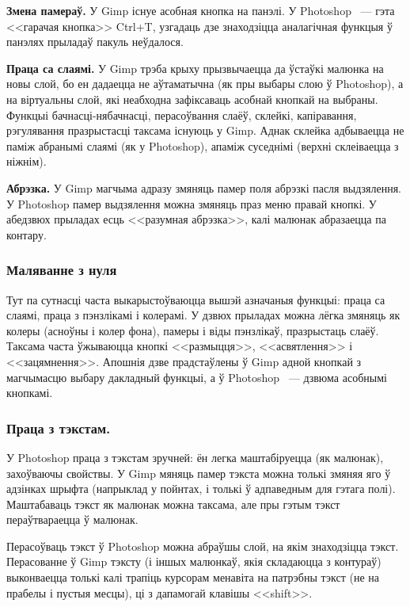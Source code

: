 \documentclass[10pt, a5paper]{article}
\begin{document}
\textbf{Змена памераў.} У Gimp існуе асобная кнопка на панэлі. У Photoshop ~--- гэта <<гарачая кнопка>> Ctrl+T, узгадаць дзе знаходзіцца аналагічная функцыя ў панэлях прыладаў пакуль неўдалося.

\textbf{Праца са слаямі.} У Gimp трэба крыху прызвычаецца да \linebreak ўстаўкі малюнка на новы слой, бо ен дадаецца не аўтаматычна (як пры выбары слою ў Photoshop), а на віртуальны слой, які неабходна зафіксаваць асобнай кнопкай на выбраны.
Функцыі бачнасці-нябачнасці, перасоўвання слаёў, склейкі, капіравання, рэгулявання празрыстасці таксама існуюць у Gimp. Аднак склейка адбываецца не паміж абранымі слаямі (як у Photoshop), апаміж суседнімі (верхні склеіваецца з ніжнім).

\textbf{Абрэзка.} У Gimp магчыма адразу змяняць памер поля абрэзкі пасля выдзялення. У Photoshop памер выдзялення можна змяняць праз меню правай кнопкі. У абедзвюх прыладах есць <<разумная абрэзка>>, калі малюнак абразаецца па контару.

\subsubsection*{Маляванне з нуля}

Тут па сутнасці часта выкарыстоўваюцца вышэй азначаныя \linebreak функцыі: праца са слаямі, праца з пэнзлікамі і колерамі. У дзвюх прыладах можна лёгка змяняць як колеры (асноўны і колер фона), памеры і віды пэнзлікаў, празрыстаць слаёў.
Таксама часта ўжываюцца кнопкі <<размыцця>>, <<асвятлення>> і <<зацямнення>>. Апошнія дзве прадстаўлены ў Gimp адной кнопкай з магчымасцю выбару дакладный функцыі, а ў Photoshop ~--- дзвюма асобнымі кнопкамі.

\subsubsection*{Праца з тэкстам.}

У Photoshop праца з тэкстам зручней: ён легка маштабіруецца (як малюнак), захоўваючы свойствы. У Gimp мяняць памер тэкста можна толькі змяняя яго ў адзінках шрыфта (напрыклад у пойнтах, і толькі ў адпаведным для гэтага полі). Маштабаваць тэкст як малюнак можна таксама, але пры гэтым тэкст пераўтвараецца ў малюнак.

Перасоўваць тэкст ў Photoshop можна абраўшы слой, на якім знаходзіцца тэкст.
Перасованне ў Gimp тэксту (і іншых малюнкаў, якія складаюцца з контураў) выконваецца толькі калі трапіць курсорам менавіта на патрэбны тэкст (не на прабелы і пустыя месцы), ці з дапамогай клавішы <<shift>>.
\end{document}
